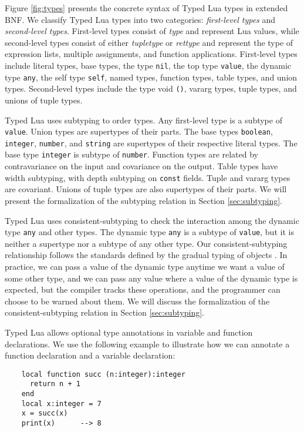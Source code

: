 Figure \ref{fig:types} presents the concrete syntax of
Typed Lua types in extended BNF.
We classify Typed Lua types into two categories:
\emph{first-level types} and \emph{second-level types}.
First-level types consist of \emph{type} and represent Lua values,
while second-level types consist of either \emph{tupletype} or
\emph{rettype} and represent the type of expression lists,
multiple assignments, and function applications.
First-level types include literal types, base types, the type \texttt{nil},
the top type \texttt{value}, the dynamic type \texttt{any},
the self type \texttt{self}, named types, function types, table types,
and union types.
Second-level types include the type void \texttt{()},
vararg types, tuple types, and unions of tuple types.

Typed Lua uses subtyping to order types.
Any first-level type is a subtype of \texttt{value}.
Union types are supertypes of their parts.
The base types \texttt{boolean}, \texttt{integer}, \texttt{number},
and \texttt{string} are supertypes of their respective literal types.
The base type \texttt{integer} is subtype of \texttt{number}.
Function types are related by contravariance on the input
and covariance on the output.
Table types have width subtyping, with depth subtyping on
\texttt{const} fields.
Tuple and vararg types are covariant.
Unions of tuple types are also supertypes of their parts.
We will present the formalization of the subtyping relation
in Section \ref{sec:subtyping}.

Typed Lua uses consistent-subtyping to check the interaction among the
dynamic type \texttt{any} and other types.
The dynamic type \texttt{any} is a subtype of \texttt{value}, but it is
neither a supertype nor a subtype of any other type.
Our consistent-subtyping relationship follows the standards defined
by the gradual typing of objects \citep{siek2007objects,siek2013mutable}.
In practice, we can pass a value of the dynamic type anytime we want
a value of some other type, and we can pass any value where a
value of the dynamic type is expected, but the compiler tracks these
operations, and the programmer can choose to be warned about them.
We will discuss the formalization of the consistent-subtyping
relation in Section \ref{sec:subtyping}.

Typed Lua allows optional type annotations in variable and function
declarations.
We use the following example to illustrate how we can annotate a
function declaration and a variable declaration:
\begin{verbatim}
    local function succ (n:integer):integer
      return n + 1
    end
    local x:integer = 7
    x = succ(x)
    print(x)      --> 8
\end{verbatim}

